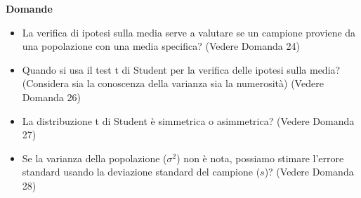 \documentclass[12pt, a4paper]{article}
\newenvironment{reflectionbox}{%
    \medskip %
    \begin{framed}\par\noindent
    \textbf{\color{boxtitlecolor}Domande} \par
    \begin{itemize}[leftmargin=*, label=$\blacktriangleright$]
}{%
    \end{itemize}\par
    \end{framed}
    \medskip %
}
\newcommand{\popvar}{\sigma^2} %
\newcommand{\samplesd}{s} %
\begin{document}
\begin{reflectionbox}
    \item La verifica di ipotesi sulla media serve a valutare se un campione proviene da una popolazione con una media specifica? (Vedere Domanda 24)
    \item Quando si usa il test t di Student per la verifica delle ipotesi sulla media? (Considera sia la conoscenza della varianza sia la numerosità) (Vedere Domanda 26)
    \item La distribuzione t di Student è simmetrica o asimmetrica? (Vedere Domanda 27)
    \item Se la varianza della popolazione ($\popvar$) non è nota, possiamo stimare l'errore standard usando la deviazione standard del campione ($\samplesd$)? (Vedere Domanda 28)
\end{reflectionbox}
\end{document}

